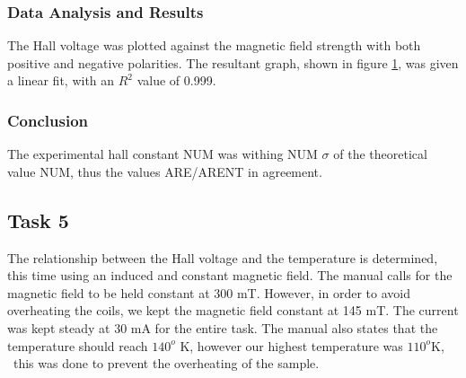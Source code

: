 \documentclass[a4paper]{article}
\begin{document}
\subsubsection{Data Analysis and Results}
\qq The Hall voltage was plotted against the magnetic field strength
with both positive and negative polarities. The resultant graph, shown
in figure \ref{task24plot}, was given a linear fit, with an $R^2$
value of 0.999.

\begin{figure}[H]
\centering
\label{task24plot}
\end{figure}








\subsubsection{Conclusion}
\qq The experimental hall constant NUM was withing NUM $\sigma$ of the
theoretical value NUM, thus the values ARE/ARENT in agreement.

\subsection{Task 5}

\qq The relationship between the Hall voltage and the temperature is
determined, this time using an induced and constant magnetic
field. The manual calls for the magnetic field to be held constant at
300 mT. However, in order to avoid overheating the coils, we kept the
magnetic field constant at 145 mT. The current was kept steady at 30
mA for the entire task. The manual also states that the temperature
should reach $140^o$ K, however our highest temperature was $110^o$K, \
this was done to prevent the overheating of the sample.
\end{document}
